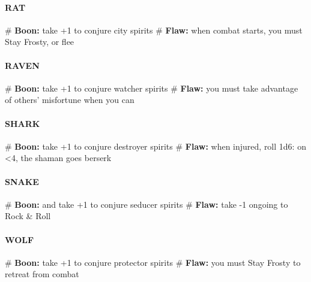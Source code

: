 \paragraph{RAT}
    \begin{easylist}
        # \textbf{Boon:} take +1 to conjure city spirits
        # \textbf{Flaw:} when combat starts, you must Stay Frosty, or flee
    \end{easylist}

\paragraph{RAVEN}
    \begin{easylist}
        # \textbf{Boon:} take +1 to conjure watcher spirits
        # \textbf{Flaw:} you must take advantage of others’ misfortune when you can
    \end{easylist}

\paragraph{SHARK}
    \begin{easylist}
        # \textbf{Boon:} take +1 to conjure destroyer spirits
        # \textbf{Flaw:} when injured, roll 1d6: on <4, the shaman goes berserk
    \end{easylist}

\paragraph{SNAKE}
    \begin{easylist}
        # \textbf{Boon:} and take +1 to conjure seducer spirits
        # \textbf{Flaw:} take -1 ongoing to Rock \& Roll
    \end{easylist}

\paragraph{WOLF}
    \begin{easylist}
        # \textbf{Boon:} take +1 to conjure protector spirits
        # \textbf{Flaw:} you must Stay Frosty to retreat from combat
    \end{easylist}
